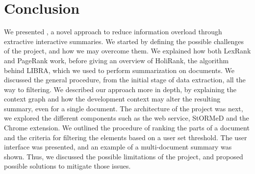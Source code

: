 \section{Conclusion}\label{sec:conclusion}
We presented \projectName, a novel approach to reduce information overload through extractive interactive summaries. We started by defining the possible challenges of the project, and how we may overcome them. We explained how both LexRank and PageRank work, before giving an overview of HoliRank, the algorithm behind LIBRA, which we used to perform summarization on documents. We discussed the general procedure, from the initial stage of data extraction, all the way to filtering. We described our approach more in depth, by explaining the context graph and how the development context may alter the resulting summary, even for a single document. The architecture of the project was next, we explored the different components such as the web service, StORMeD and the Chrome extension. We outlined the procedure of ranking the parts of a document and the criteria for filtering the elements based on a user set threshold. The user interface was presented, and an example of a multi-document summary was shown. Thus, we discussed the possible limitations of the project, and proposed possible solutions to mitigate those issues.
